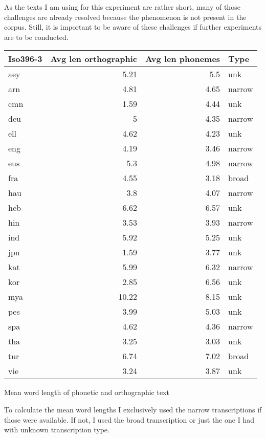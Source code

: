 As the texts I am using for this experiment are rather short, many of those challenges are already resolved because the phenomenon is not present in the corpus. Still, it is important to be aware of these challenges if further experiments are to be conducted.

{
\begin{tabular}{|lrrl|}
\hline
\textbf{Iso396-3}   &   \textbf{Avg len orthographic} &   \textbf{Avg len phonemes} & \textbf{Type}   \\
\hline
\hline
aey        &                   5.21 &               5.5  & unk    \\
arn        &                   4.81 &               4.65 & narrow \\
cmn        &                   1.59 &               4.44 & unk    \\
deu        &                   5    &               4.35 & narrow \\
ell        &                   4.62 &               4.23 & unk    \\
eng        &                   4.19 &               3.46 & narrow \\
eus        &                   5.3  &               4.98 & narrow \\
fra        &                   4.55 &               3.18 & broad  \\
hau        &                   3.8  &               4.07 & narrow \\
heb        &                   6.62 &               6.57 & unk    \\
hin        &                   3.53 &               3.93 & narrow \\
ind        &                   5.92 &               5.25 & unk    \\
jpn        &                   1.59 &               3.77 & unk    \\
kat        &                   5.99 &               6.32 & narrow \\
kor        &                   2.85 &               6.56 & unk    \\
mya        &                  10.22 &               8.15 & unk    \\
pes        &                   3.99 &               5.03 & unk    \\
spa        &                   4.62 &               4.36 & narrow \\
tha        &                   3.25 &               3.03 & unk    \\
tur        &                   6.74 &               7.02 & broad  \\
vie        &                   3.24 &               3.87 & unk    \\
\hline
\end{tabular}
}{Mean word length of phonetic and orthographic text}


To calculate the mean word lengths I exclusively used the narrow transcriptions if those were available. If not, I used the broad transcription or just the one I had with unknown transcription type. 




